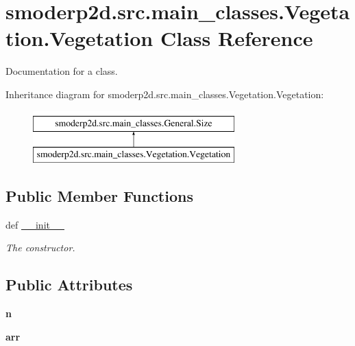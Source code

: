 \hypertarget{classsmoderp2d_1_1src_1_1main__classes_1_1Vegetation_1_1Vegetation}{\section{smoderp2d.\-src.\-main\-\_\-classes.\-Vegetation.\-Vegetation Class Reference}
\label{classsmoderp2d_1_1src_1_1main__classes_1_1Vegetation_1_1Vegetation}
}


Documentation for a class.  


Inheritance diagram for smoderp2d.\-src.\-main\-\_\-classes.\-Vegetation.\-Vegetation\-:\begin{figure}[H]
\begin{center}
\leavevmode
\includegraphics[height=2.000000cm]{d7/d67/classsmoderp2d_1_1src_1_1main__classes_1_1Vegetation_1_1Vegetation}
\end{center}
\end{figure}
\subsection*{Public Member Functions}
\begin{DoxyCompactItemize}
\item 
def \hyperlink{classsmoderp2d_1_1src_1_1main__classes_1_1Vegetation_1_1Vegetation_a43109cd6b3a251504b55454a9a838ec3}{\-\_\-\-\_\-init\-\_\-\-\_\-}
\begin{DoxyCompactList}\small\item\em The constructor. \end{DoxyCompactList}\end{DoxyCompactItemize}
\subsection*{Public Attributes}
\begin{DoxyCompactItemize}
\item 
\hypertarget{classsmoderp2d_1_1src_1_1main__classes_1_1Vegetation_1_1Vegetation_a9593101bb8240bc05a0f96b25a584c61}{{\bfseries n}}\label{classsmoderp2d_1_1src_1_1main__classes_1_1Vegetation_1_1Vegetation_a9593101bb8240bc05a0f96b25a584c61}

\item 
\hypertarget{classsmoderp2d_1_1src_1_1main__classes_1_1Vegetation_1_1Vegetation_a507eb051e0057baa26987568f2cae514}{{\bfseries arr}}\label{classsmoderp2d_1_1src_1_1main__classes_1_1Vegetation_1_1Vegetation_a507eb051e0057baa26987568f2cae514}

\end{DoxyCompactItemize}


